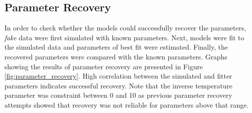 \documentclass[a4paper,12pt]{article}
\begin{document}











%
% 


\subsection*{Parameter Recovery}
In order to check whether the models could successfully recover the parameters, \textit{fake} data were first simulated with known parameters. Next, models were fit to the simulated data and parameters of best fit were estimated. Finally, the recovered parameters were compared with the known parameters. Graphs showing the results of parameter recovery are presented in Figure \ref{fig:parameter_recovery}. High correlation between the simulated and fitter parameters indicates successful recovery. Note that the inverse temperature parameter was constraint between 0 and 10 as previous parameter recovery attempts showed that recovery was not reliable for parameters above that range. 
\end{document}
